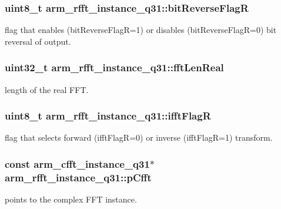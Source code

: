 \subsubsection[{\texorpdfstring{bit\+Reverse\+FlagR}{bitReverseFlagR}}]{\setlength{\rightskip}{0pt plus 5cm}uint8\+\_\+t arm\+\_\+rfft\+\_\+instance\+\_\+q31\+::bit\+Reverse\+FlagR}\hypertarget{structarm__rfft__instance__q31_a3cb90cdc928a88b0203917dcb3dc1b71}{}\label{structarm__rfft__instance__q31_a3cb90cdc928a88b0203917dcb3dc1b71}
flag that enables (bit\+Reverse\+FlagR=1) or disables (bit\+Reverse\+FlagR=0) bit reversal of output. 
\subsubsection[{\texorpdfstring{fft\+Len\+Real}{fftLenReal}}]{\setlength{\rightskip}{0pt plus 5cm}uint32\+\_\+t arm\+\_\+rfft\+\_\+instance\+\_\+q31\+::fft\+Len\+Real}\hypertarget{structarm__rfft__instance__q31_af777b0cadd5abaf064323692c2e6693b}{}\label{structarm__rfft__instance__q31_af777b0cadd5abaf064323692c2e6693b}
length of the real F\+FT. 
\subsubsection[{\texorpdfstring{ifft\+FlagR}{ifftFlagR}}]{\setlength{\rightskip}{0pt plus 5cm}uint8\+\_\+t arm\+\_\+rfft\+\_\+instance\+\_\+q31\+::ifft\+FlagR}\hypertarget{structarm__rfft__instance__q31_af5c2615e6cde15524df38fa57ea32d94}{}\label{structarm__rfft__instance__q31_af5c2615e6cde15524df38fa57ea32d94}
flag that selects forward (ifft\+FlagR=0) or inverse (ifft\+FlagR=1) transform. 
\subsubsection[{\texorpdfstring{p\+Cfft}{pCfft}}]{\setlength{\rightskip}{0pt plus 5cm}const {\bf arm\+\_\+cfft\+\_\+instance\+\_\+q31}$\ast$ arm\+\_\+rfft\+\_\+instance\+\_\+q31\+::p\+Cfft}\hypertarget{structarm__rfft__instance__q31_a8fe10d425b59e096c23aa4bb5caa1974}{}\label{structarm__rfft__instance__q31_a8fe10d425b59e096c23aa4bb5caa1974}
points to the complex F\+FT instance. 
